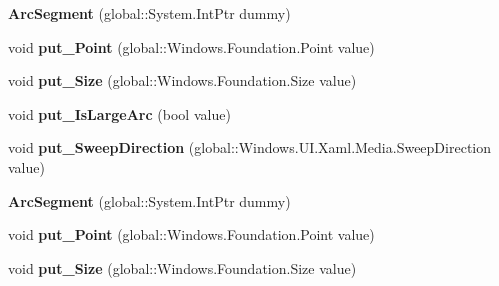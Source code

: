 \begin{DoxyCompactItemize}
{\bfseries Arc\+Segment} (global\+::\+System.\+Int\+Ptr dummy)
\item 
\mbox{\label{class_windows_1_1_u_i_1_1_xaml_1_1_media_1_1_arc_segment_ae3cc83e3cf50e15df1a76fe35abd93c5}} 
void {\bfseries put\+\_\+\+Point} (global\+::\+Windows.\+Foundation.\+Point value)
\item 
\mbox{\label{class_windows_1_1_u_i_1_1_xaml_1_1_media_1_1_arc_segment_af67de1df1942a7178681283b9126b59e}} 
void {\bfseries put\+\_\+\+Size} (global\+::\+Windows.\+Foundation.\+Size value)
\item 
\mbox{\label{class_windows_1_1_u_i_1_1_xaml_1_1_media_1_1_arc_segment_acd90b8a046abf2f9ce5f5d8f96ef7518}} 
void {\bfseries put\+\_\+\+Is\+Large\+Arc} (bool value)
\item 
\mbox{\label{class_windows_1_1_u_i_1_1_xaml_1_1_media_1_1_arc_segment_a82728182889ceaef7ff54beab34e9b94}} 
void {\bfseries put\+\_\+\+Sweep\+Direction} (global\+::\+Windows.\+U\+I.\+Xaml.\+Media.\+Sweep\+Direction value)
\item 
\mbox{\label{class_windows_1_1_u_i_1_1_xaml_1_1_media_1_1_arc_segment_a429457ddfea0ab424e587c2be0398db2}} 
{\bfseries Arc\+Segment} (global\+::\+System.\+Int\+Ptr dummy)
\item 
\mbox{\label{class_windows_1_1_u_i_1_1_xaml_1_1_media_1_1_arc_segment_ae3cc83e3cf50e15df1a76fe35abd93c5}} 
void {\bfseries put\+\_\+\+Point} (global\+::\+Windows.\+Foundation.\+Point value)
\item 
\mbox{\label{class_windows_1_1_u_i_1_1_xaml_1_1_media_1_1_arc_segment_af67de1df1942a7178681283b9126b59e}} 
void {\bfseries put\+\_\+\+Size} (global\+::\+Windows.\+Foundation.\+Size value)
\item 
\mbox{\label{class_windows_1_1_u_i_1_1_xaml_1_1_media_1_1_arc_segment_acd90b8a046abf2f9ce5f5d8f96ef7518}} 

\end{DoxyCompactItemize}
